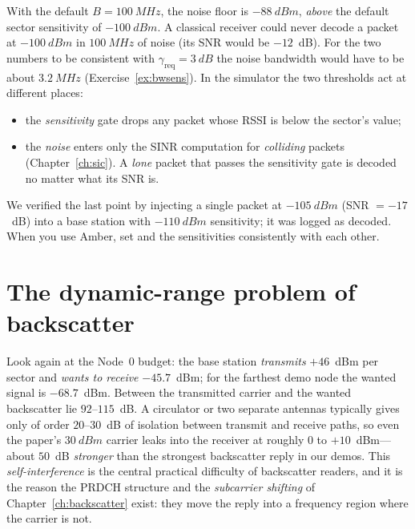 \begin{reality}
With the default $B=\SI{100}{MHz}$, the noise floor is $\SI{-88}{dBm}$, \emph{above}
the default sector sensitivity of $\SI{-100}{dBm}$. A classical receiver could never
decode a packet at $\SI{-100}{dBm}$ in $\SI{100}{MHz}$ of noise (its SNR would be
$-12$~dB). For the two numbers to be consistent with $\gamma_{\mathrm{req}}=\SI{3}{dB}$ the noise bandwidth would have to be
about $\SI{3.2}{MHz}$ (Exercise~\ref{ex:bwsens}). In the simulator the two thresholds act at different
places:
\begin{itemize}
 \item the \emph{sensitivity} gate drops any packet whose RSSI is below the
   sector's value;
 \item the \emph{noise} enters only the SINR computation for \emph{colliding}
   packets (Chapter~\ref{ch:sic}). A \emph{lone} packet that passes the sensitivity
   gate is decoded no matter what its SNR is.
\end{itemize}
We verified the last point by injecting a single packet at $\SI{-105}{dBm}$
(SNR $=-17$~dB) into a base station with $\SI{-110}{dBm}$ sensitivity; it was logged as decoded.
When you use Amber, set  and the sensitivities consistently with each other.
\end{reality}

\section{The dynamic-range problem of backscatter}
\label{sec:dynrange}

Look again at the Node~0 budget: the base station \emph{transmits} $+46$~dBm per sector
and \emph{wants to receive} $-45.7$~dBm; for the farthest demo node the wanted signal
is $-68.7$~dBm. Between the transmitted carrier and the wanted backscatter lie
$92$--$115$~dB. A circulator or two separate antennas typically gives
only of order $20$--$30$~dB of isolation between transmit and receive paths, so
even the paper's $\SI{+30}{dBm}$ carrier leaks into the receiver at roughly
$0$ to $+10$~dBm---about $50$~dB \emph{stronger} than the strongest backscatter reply
in our demos. This
\emph{self-interference} is the central practical difficulty of backscatter
readers, and it is the reason the PRDCH structure and the \emph{subcarrier
shifting} of Chapter~\ref{ch:backscatter} exist: they move the reply into a
frequency region where the carrier is not.

